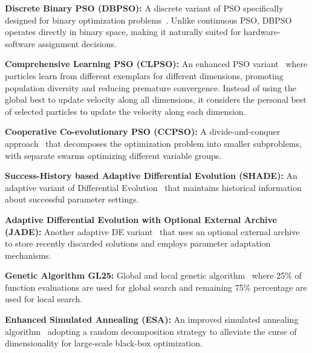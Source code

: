 \textbf{Discrete Binary PSO (DBPSO):} A discrete variant of PSO specifically designed for binary optimization problems~\cite{kennedy1997discrete}. Unlike continuous PSO, DBPSO operates directly in binary space, making it naturally suited for hardware-software assignment decisions.

\textbf{Comprehensive Learning PSO (CLPSO):} An enhanced PSO variant~\cite{liang2006comprehensive} where particles learn from different exemplars for different dimensions, promoting population diversity and reducing premature convergence. Instead of using the global best to update velocity along all dimensions, it considers the personal best of selected particles to update the velocity along each dimension.

\textbf{Cooperative Co-evolutionary PSO (CCPSO):} A divide-and-conquer approach~\cite{li2011cooperatively} that decomposes the optimization problem into smaller subproblems, with separate swarms optimizing different variable groups.

\textbf{Success-History based Adaptive Differential Evolution (SHADE):} An adaptive variant of Differential Evolution~\cite{tanabe2013success} that maintains historical information about successful parameter settings.

\textbf{Adaptive Differential Evolution with Optional External Archive (JADE):} Another adaptive DE variant~\cite{zhang2009jade} that uses an optional external archive to store recently discarded solutions and employs parameter adaptation mechanisms.

\textbf{Genetic Algorithm GL25:} Global and local genetic algorithm~\cite{garcia2008global} where 25\% of function evaluations are used for global search and remaining 75\% percentage are used for local search.

\textbf{Enhanced Simulated Annealing (ESA):} An improved simulated annealing algorithm~\cite{siarry1997enhanced} adopting a random decomposition strategy to alleviate the curse of dimensionality for large-scale black-box optimization.


